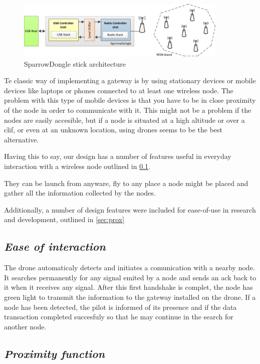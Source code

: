 \label{chap:arch}

\begin{figure}[ht] \centering
\includegraphics[width=0.9\textwidth]{img/Architecture.png}
\caption{SparrowDongle stick architecture} \end{figure}

Te classic way of implementing a gateway is by using stationary devices or mobile devices like laptops or phones connected to at least one wireless node. The problem with this type of mobile devices is that you have to be in close proximity of the node in order to communicate with it. This might not be a problem if the nodes are easily accesible, but if a node is situated at a high altitude or over a clif, or even at an unknown location, using drones seems to be the best alternative.

Having this to say, our design has a number of features useful in everyday interaction with a wireless node outlined in \ref{sec:inter}. 

They can be launch from anyware, fly to any place a node might be placed and gather all the information collected by the nodes.

Additionally, a number of design features were included for ease-of-use in
research and development, outlined in \ref{sec:prox}


\subsection{\textit{Ease of interaction}} 

\label{sec:inter}

The drone automaticaly detects and initiates a comunication with a nearby node. It searches permanently for any signal emited by a node and sends an ack back to it when it receives any signal. After this first handshake is complet, the node has green light to transmit the information to the gateway installed on the drone. If a node has been detected, the pilot is informed of its presence and if the data transaction completed succesfuly so that he may continue in the search for another node.

\subsection{\textit{Proximity function}} 

